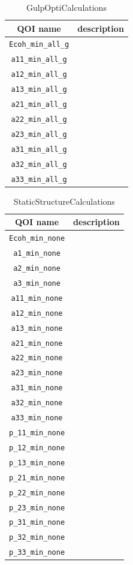 \begin{table}[ht]
	\centering
	\caption{GulpOptiCalculations}
	\begin{tabular}{cc}
		\hline
		QOI name & description \\
		\hline
		\verb|Ecoh_min_all_g| \\
    \verb|a11_min_all_g| \\
	  \verb|a12_min_all_g| \\
	  \verb|a13_min_all_g| \\
    \verb|a21_min_all_g| \\
	  \verb|a22_min_all_g| \\
	  \verb|a23_min_all_g| \\
    \verb|a31_min_all_g| \\
	  \verb|a32_min_all_g| \\
	  \verb|a33_min_all_g| \\
		\hline
	\end{tabular}
\end{table}

\begin{table}[ht]
	\centering
	\caption{StaticStructureCalculations}
	\begin{tabular}{cc}
		\hline
		QOI name & description \\
		\hline
	  \verb|Ecoh_min_none|  \\
    \verb|a1_min_none|  \\
		\verb|a2_min_none|  \\
		\verb|a3_min_none|  \\
    \verb|a11_min_none|  \\
		\verb|a12_min_none|  \\
		\verb|a13_min_none|  \\
    \verb|a21_min_none|  \\
		\verb|a22_min_none|  \\
		\verb|a23_min_none|  \\
    \verb|a31_min_none|  \\
		\verb|a32_min_none|  \\
		\verb|a33_min_none|  \\
    \verb|p_11_min_none|  \\
		\verb|p_12_min_none|  \\
		\verb|p_13_min_none|  \\
    \verb|p_21_min_none|  \\
		\verb|p_22_min_none|  \\
		\verb|p_23_min_none|  \\
    \verb|p_31_min_none|  \\
		\verb|p_32_min_none|  \\
		\verb|p_33_min_none|  \\
		\hline
	\end{tabular}
\end{table}

